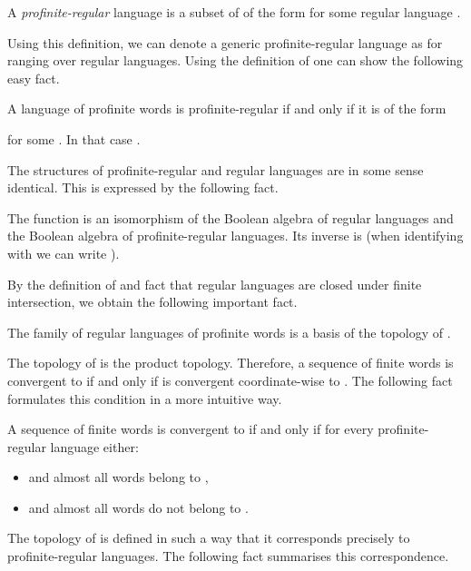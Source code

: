 \documentclass{LMCS}
\begin{document}
\begin{definition}
A \emph{profinite-regular} language is a subset of  of the form  for some regular language .
\end{definition}

Using this definition, we can denote a generic profinite-regular language as  for  ranging over regular languages. Using the definition of  one can show the following easy fact.

\begin{fact}\label{ft:coordinates}
A language of profinite words  is profinite-regular if and only if it is of the form

for some . In that case .
\end{fact}

The structures of profinite-regular and regular languages are in some sense identical. This is expressed by the following fact.

\begin{theorem}\label{th:iso}
The function  is an isomorphism of the Boolean algebra of regular languages and the Boolean algebra of profinite-regular languages. Its inverse is  (when identifying  with  we can write ).
\end{theorem}

By the definition of  and fact that regular languages are closed under finite intersection, we obtain the following important fact.

\begin{fact}\label{ft:basis}
The family of regular languages of profinite words is a basis of the topology of .
\end{fact}

The topology of  is the product topology. Therefore, a sequence of finite words  is convergent to  if and only if  is convergent coordinate-wise to . The following fact formulates this condition in a more intuitive way.

\begin{fact}\label{ft:conv_seq}
A sequence of finite words  is convergent to  if and only if for every profinite-regular language  either:
\begin{itemize}
\item  and almost all words  belong to ,
\item  and almost all words  do not belong to .
\end{itemize}
\end{fact}

The topology of  is defined in such a way that it corresponds precisely to profinite-regular languages. The following fact summarises this correspondence.
\end{document}
